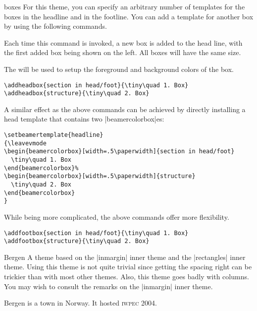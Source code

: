 \begin{themeexample}[{\opt{|[headheight=|\meta{head height}|,footheight=|\meta{foot height}|]|}}]{boxes}
  For this theme, you can specify an arbitrary number of templates for the boxes in the headline and in the footline. You can add a template for another box by using the following commands.

  \begin{command}{\addheadbox{}}
    Each time this command is invoked, a new box is added to the head line, with the first added box being shown on the left. All boxes will have the same size.

    The  will be used to setup the foreground and background colors of the box.

    \example
\begin{verbatim}
\addheadbox{section in head/foot}{\tiny\quad 1. Box}
\addheadbox{structure}{\tiny\quad 2. Box}
\end{verbatim}

    A similar effect as the above commands can be achieved by directly installing a head template that contains two |beamercolorbox|es:

\begin{verbatim}
\setbeamertemplate{headline}
{\leavevmode
\begin{beamercolorbox}[width=.5\paperwidth]{section in head/foot}
  \tiny\quad 1. Box
\end{beamercolorbox}%
\begin{beamercolorbox}[width=.5\paperwidth]{structure}
  \tiny\quad 2. Box
\end{beamercolorbox}
}
\end{verbatim}

    While being more complicated, the above commands offer more flexibility.
  \end{command}

  \begin{command}{\addfootbox{}}
    \example
\begin{verbatim}
\addfootbox{section in head/foot}{\tiny\quad 1. Box}
\addfootbox{structure}{\tiny\quad 2. Box}
\end{verbatim}
  \end{command}
\end{themeexample}

\begin{themeexample}{Bergen}
  A theme based on the |inmargin| inner theme and the |rectangles| inner theme. Using this theme is not quite trivial since getting the spacing right can be trickier than with most other themes. Also, this theme goes badly with columns. You may wish to consult the remarks on the |inmargin| inner theme.

  Bergen is a town in Norway. It hosted \textsc{iwpec} 2004.
\end{themeexample}

